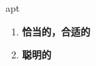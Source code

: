 
\begin{frame}
{\huge apt}
\begin{center}
\begin{enumerate}\Large
  \item \textbf{恰当的，合适的}
  \item \textbf{聪明的}
\end{enumerate}
\end{center}
\end{frame}
